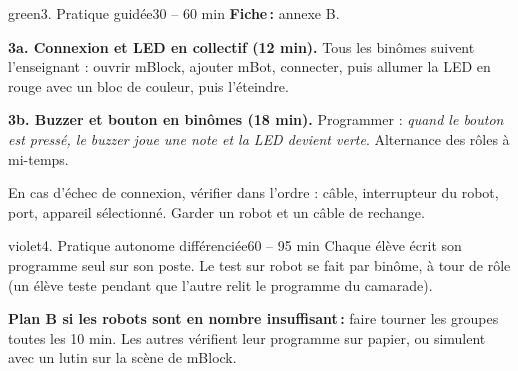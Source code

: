 \documentclass[11pt,a4paper]{article}
\begin{document}
\begin{etape}{green}{3. Pratique guidée}{30 -- 60 min}
\textbf{Fiche\,:} annexe B.

\textbf{3a. Connexion et LED en collectif (12 min).} Tous les binômes suivent l'enseignant : ouvrir mBlock, ajouter mBot, connecter, puis allumer la LED en rouge avec un bloc de couleur, puis l'éteindre.

\textbf{3b. Buzzer et bouton en binômes (18 min).} Programmer : \emph{quand le bouton est pressé, le buzzer joue une note et la LED devient verte}. Alternance des rôles à mi-temps.


\begin{astuce}
En cas d'échec de connexion, vérifier dans l'ordre : câble, interrupteur du robot, port, appareil sélectionné. Garder un robot et un câble de rechange.
\end{astuce}
\end{etape}

\begin{etape}{violet}{4. Pratique autonome différenciée}{60 -- 95 min}
Chaque élève écrit son programme seul sur son poste. Le test sur robot se fait par binôme, à tour de rôle (un élève teste pendant que l'autre relit le programme du camarade).

\medskip
{}

\medskip
\textbf{Plan B si les robots sont en nombre insuffisant\,:} faire tourner les groupes toutes les 10 min. Les autres vérifient leur programme sur papier, ou simulent avec un lutin sur la scène de mBlock.
\end{etape}
\end{document}
